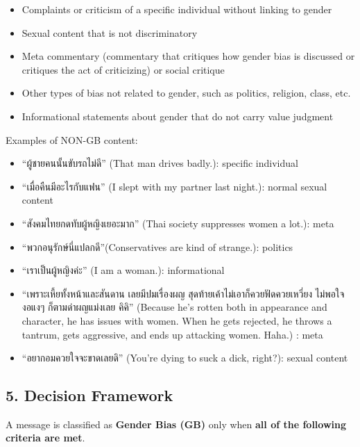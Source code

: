 \documentclass[12pt,oneside,openright,a4paper]{cpe-english-project}
\begin{document}
\begin{itemize}
\setlength{\itemsep}{0.15\baselineskip}
\setlength{\parsep}{0pt}
\setlength{\parskip}{0pt}
\item
  Complaints or criticism of a specific individual without linking to
  gender
\item
  Sexual content that is not discriminatory
\item
  Meta commentary (commentary that critiques how gender bias is
  discussed or critiques the act of criticizing) or social critique
\item
  Other types of bias not related to gender, such as politics, religion,
  class, etc.
\item
  Informational statements about gender that do not carry value judgment
\end{itemize}

Examples of NON-GB content:

\begin{itemize}
\setlength{\itemsep}{0.15\baselineskip}
\setlength{\parsep}{0pt}
\setlength{\parskip}{0pt}
\item
  ``ผู้ชายคนนั้นขับรถไม่ดี'' (That man drives badly.): specific individual
\item
  ``เมื่อคืนมีอะไรกับแฟน'' (I slept with my partner last night.): normal
  sexual content
\item
  ``สังคมไทยกดทับผู้หญิงเยอะมาก'' (Thai society suppresses women a lot.):
  meta
\item
  ``พวกอนุรักษ์นี่แปลกดี''(Conservatives are kind of strange.): politics
\item
  ``เราเป็นผู้หญิงค่ะ'' (I am a woman.): informational
\item
  ``เพราะเหี้ยทั้งหน้าและสันดาน เลยมีปมเรื่องผญ สุดท้ายเค้าไม่เอาก็ควยฟัดควยเหวี่ยง
  ไม่พอใจ งอแงๆ ก็ตามด่าผญแม่งเลย คิคิ'' (Because he's rotten both in
  appearance and character, he has issues with women. When he gets
  rejected, he throws a tantrum, gets aggressive, and ends up attacking
  women. Haha.) : meta
\item
  ``อยากอมควยใจจะขาดเลยดิ'' (You're dying to suck a dick, right?): sexual
  content

  \end{itemize}

\subsection{5. Decision Framework}\label{decision-framework}

A message is classified as \textbf{Gender Bias (GB)} only when
\textbf{all of the following criteria are met}.
\end{document}
